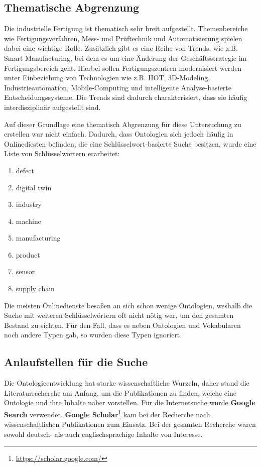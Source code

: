 \documentclass{article}
\begin{document}
\subsection{Thematische Abgrenzung}

Die industrielle Fertigung ist thematisch sehr breit aufgestellt.
Themenbereiche wie Fertigungsverfahren, Mess- und Prüftechnik und Automatisierung spielen dabei eine wichtige Rolle.
Zusätzlich gibt es eine Reihe von Trends, wie z.B. Smart Manufacturing, bei dem es um eine Änderung der Geschäftsstrategie im Fertigungsbereich geht.
Hierbei sollen Fertigungszentren modernisiert werden unter Einbeziehung von Technologien wie z.B. IIOT, 3D-Modeling, Industrieautomation, Mobile-Computing und intelligente Analyse-basierte Entscheidungssysteme.
Die Trends sind dadurch charakterisiert, dass sie häufig interdisziplinär aufgestellt sind.

Auf dieser Grundlage eine thematisch Abgrenzung für diese Untersuchung zu erstellen war nicht einfach.
Dadurch, dass Ontologien sich jedoch häufig in Onlinediesten befinden, die eine Schlüsselwort-basierte Suche besitzen, wurde eine Liste von Schlüsselwörtern erarbeitet:

\begin{enumerate}
    \item defect
    \item digital twin
    \item industry
    \item machine
    \item manufacturing
    \item product
    \item sensor
    \item supply chain
\end{enumerate}

Die meisten Onlinedienste besaßen an sich schon wenige Ontologien, weshalb die Suche mit weiteren Schlüsselwörtern oft nicht nötig war, um den gesamten Bestand zu sichten.
Für den Fall, dass es neben Ontologien und Vokabularen noch andere Typen gab, so wurden diese Typen ignoriert.

\subsection{Anlaufstellen für die Suche}

Die Ontologieentwicklung hat starke wissenschaftliche Wurzeln, daher stand die Literaturrecherche am Anfang, um die Publikationen zu finden, welche eine Ontologie und ihre Inhalte näher vorstellen.
Für die Internetsuche wurde \textbf{Google Search} verwendet.
\textbf{Google Scholar}\footnote{\url{https://scholar.google.com/}} kam bei der Recherche nach wissenschaftlichen Publikationen zum Einsatz.
Bei der gesamten Recherche waren sowohl deutsch- als auch englischsprachige Inhalte von Interesse.
\end{document}
